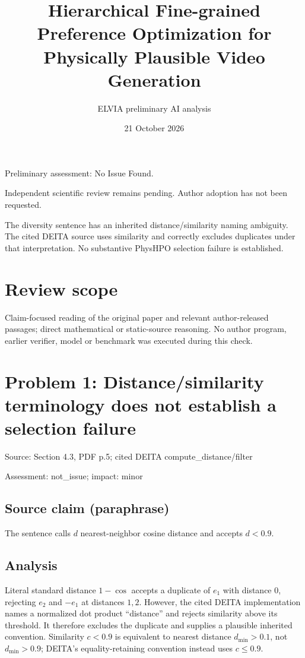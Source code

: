 \documentclass[11pt]{article}
\begin{document}
\title{Hierarchical Fine-grained Preference Optimization for Physically Plausible Video Generation}

\author{ELVIA preliminary AI analysis}\date{21 October 2026}\maketitle

Preliminary assessment: No Issue Found.\par

Independent scientific review remains pending. Author adoption has not been requested.

The diversity sentence has an inherited distance/similarity naming ambiguity. The cited DEITA source uses similarity and correctly excludes duplicates under that interpretation. No substantive PhysHPO selection failure is established.

\section*{Review scope}

Claim-focused reading of the original paper and relevant author-released passages; direct mathematical or static-source reasoning. No author program, earlier verifier, model or benchmark was executed during this check.

\section*{Problem 1: Distance/similarity terminology does not establish a selection failure}

Source: Section 4.3, PDF p.5; cited DEITA compute\_distance/filter

Assessment: not\_issue; impact: minor

\subsection*{Source claim (paraphrase)}

The sentence calls \(d\) nearest-neighbor cosine distance and accepts \(d<0.9\).

\subsection*{Analysis}

Literal standard distance \(1-\cos\) accepts a duplicate of \(e_1\) with distance \(0\), rejecting \(e_2\) and \(-e_1\) at distances \(1,2\). However, the cited DEITA implementation names a normalized dot product “distance” and rejects similarity above its threshold. It therefore excludes the duplicate and supplies a plausible inherited convention. Similarity \(c<0.9\) is equivalent to nearest distance \(d_{\min}>0.1\), not \(d_{\min}>0.9\); DEITA’s equality-retaining convention instead uses \(c\le0.9\).
\end{document}
